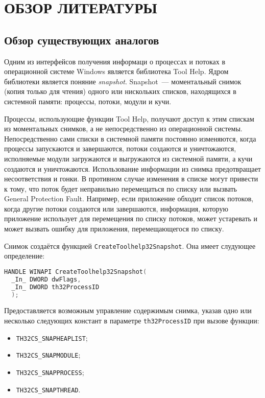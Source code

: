 \section{ОБЗОР ЛИТЕРАТУРЫ}
\label{sec:domain}

\subsection{Обзор существующих аналогов}
\label{sub:domain:analogs}

Одним из интерфейсов получения информаци о процессах и потоках в операционной
системе Windows является библиотека Tool Help\cite{tool_help_article}. Ядром
библиотеки является поняние \textit{snapshot}. Snapshot~--- моментальный снимок
(копия только для чтения) одного или нискольких списков, находящихся в системной
памяти: процессы, потоки, модули и кучи.

Процессы, использующие функции Tool Help, получают доступ к этим спискам из
моментальных снимков, а не непосредственно из операционной системы.
Непосредственно сами списки в системной памяти постоянно изменяются, когда
процессы запускаются и завершаются, потоки создаются и уничтожаются, исполняемые
модули загружаются и выгружаются из системной памяти, а кучи создаются и
уничтожаются. Использование информации из снимка предотвращает несоответствия и
гонки. В противном случае изменения в списке могут привести к тому, что поток
будет неправильно перемещаться по списку или вызвать General Protection Fault.
Например, если приложение обходит список потоков, когда другие потоки создаются
или завершаются, информация, которую приложение использует для перемещения по
списку потоков, может устаревать и может вызвать ошибку для приложения,
перемещающегося по списку.

Снимок создаётся функцией \texttt{CreateToolhelp32Snapshot}. Она имеет слудующее
определение\cite{win_tool_help}:

\bigskip
\begin{adjustwidth}{\fivecharsapprox}{}
\begin{lstlisting}[language=C, basicstyle=\small\ttfamily]
HANDLE WINAPI CreateToolhelp32Snapshot(
  _In_ DWORD dwFlags,
  _In_ DWORD th32ProcessID
  );
\end{lstlisting}
\end{adjustwidth}
\bigskip

Предоставляется возможным управление содержимым снимка, указав одно или
несколько следующих констант в параметре \texttt{th32ProcessID} при вызове
функции:
\begin{itemize}
\item \texttt{TH32CS\_SNAPHEAPLIST};
\item \texttt{TH32CS\_SNAPMODULE};
\item \texttt{TH32CS\_SNAPPROCESS};
\item \texttt{TH32CS\_SNAPTHREAD}.
\end{itemize}

